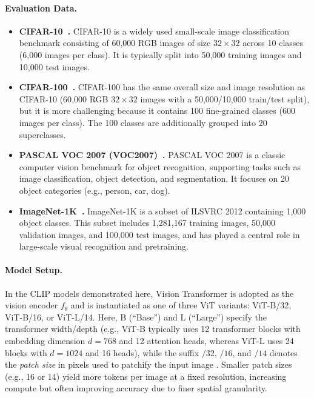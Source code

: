 \documentclass[../../book-main.tex]{subfiles}
\begin{document}
\paragraph{Evaluation Data.}
\begin{itemize}
\item \textbf{CIFAR-10~\citep{krizhevsky2009learning}.}
    CIFAR-10 is a widely used small-scale image classification
    benchmark consisting of 60{,}000 RGB images of size \(32\times
    32\) across 10 classes (6{,}000 images per class).
    It is typically split into 50{,}000 training images and 10{,}000
    test images.

\item \textbf{CIFAR-100~\citep{krizhevsky2009learning}.}
    CIFAR-100 has the same overall size and image resolution as
    CIFAR-10 (60{,}000 RGB \(32\times 32\) images with a
    50{,}000/10{,}000 train/test split), but it is more challenging
    because it contains 100 fine-grained classes (600 images per class).
    The 100 classes are additionally grouped into 20 superclasses.

\item \textbf{PASCAL VOC 2007 (VOC2007)~\citep{everingham2010pascal}.}
    PASCAL VOC 2007 is a classic computer vision benchmark for object
    recognition, supporting tasks such as image classification,
    object detection, and segmentation.
    It focuses on 20 object categories (e.g., person, car, dog).

\item \textbf{ImageNet-1K~\citep{imagenet_cvpr09}.}
    ImageNet-1K is a subset of ILSVRC 2012 containing 1{,}000 object classes.
    This subset includes 1{,}281{,}167 training images, 50{,}000
    validation images, and 100{,}000 test images, and has played a
    central role in large-scale visual recognition and pretraining.
\end{itemize}

\paragraph{Model Setup.}
In the CLIP models demonstrated here, Vision Transformer is adopted
as  the vision encoder \(f_{\theta}\) and is instantiated as one of
three ViT variants: ViT-B/32, ViT-B/16, or ViT-L/14. Here,
\(\text{B}\) (``Base'') and \(\text{L}\) (``Large'') specify the
transformer width/depth (e.g., ViT-B typically uses 12 transformer
blocks with embedding dimension \(d=768\) and 12 attention heads,
whereas ViT-L uses 24 blocks with \(d=1024\) and 16 heads), while the
suffix \(/32\), \(/16\), and \(/14\) denotes the \emph{patch size} in
pixels used to patchify the input image . Smaller patch sizes (e.g.,
16 or 14) yield more tokens per image at a fixed resolution,
increasing compute but often improving accuracy due to finer spatial
granularity.
\end{document}
